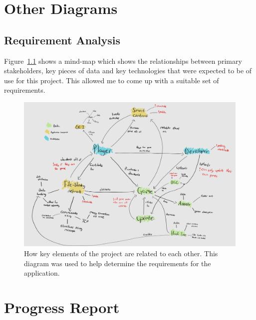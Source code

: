 \appendix




\chapter{Other Diagrams}

\section*{Requirement Analysis}\label{app:req-analysis}

Figure~\ref{fig:req-generator} shows a mind-map which shows the relationships between primary stakeholders, key pieces of data and key technologies that were expected to be of use for this project. This allowed me to come up with a suitable set of requirements.

\begin{figure}[ht]
  \centering
  \includegraphics[width=.9\textwidth]{assets/images/diagrams/requirement-generation.jpg}
  \caption{How key elements of the project are related to each other. This diagram was used to help determine the requirements for the application.}
  \label{fig:req-generator}
\end{figure}


\chapter{Progress Report}
